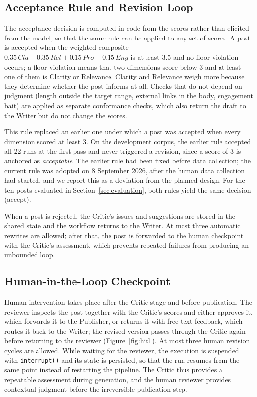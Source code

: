 \documentclass[a4paper,twoside]{article}
\begin{document}
\subsection{Acceptance Rule and Revision Loop}
\label{sec:rule}

The acceptance decision is computed in code from the scores rather than elicited from the model, so that the same rule can be applied to any set of scores. A post is accepted when the weighted composite $0.35\,\mathit{Cla} + 0.35\,\mathit{Rel} + 0.15\,\mathit{Pro} + 0.15\,\mathit{Eng}$ is at least 3.5 and no floor violation occurs; a floor violation means that two dimensions score below 3 and at least one of them is Clarity or Relevance. Clarity and Relevance weigh more because they determine whether the post informs at all. Checks that do not depend on judgment (length outside the target range, external links in the body, engagement bait) are applied as separate conformance checks, which also return the draft to the Writer but do not change the scores.

This rule replaced an earlier one under which a post was accepted when every dimension scored at least 3. On the development corpus, the earlier rule accepted all 22 runs at the first pass and never triggered a revision, since a score of 3 is anchored as \emph{acceptable}. The earlier rule had been fixed before data collection; the current rule was adopted on 8 September 2026, after the human data collection had started, and we report this as a deviation from the planned design. For the ten posts evaluated in Section~\ref{sec:evaluation}, both rules yield the same decision (accept).

When a post is rejected, the Critic's issues and suggestions are stored in the shared state and the workflow returns to the Writer. At most three automatic rewrites are allowed; after that, the post is forwarded to the human checkpoint with the Critic's assessment, which prevents repeated failures from producing an unbounded loop.

\subsection{Human-in-the-Loop Checkpoint}

Human intervention takes place after the Critic stage and before publication. The reviewer inspects the post together with the Critic's scores and either approves it, which forwards it to the Publisher, or returns it with free-text feedback, which routes it back to the Writer; the revised version passes through the Critic again before returning to the reviewer (Figure~\ref{fig:hitl}). At most three human revision cycles are allowed. While waiting for the reviewer, the execution is suspended with \texttt{interrupt()} and its state is persisted, so that the run resumes from the same point instead of restarting the pipeline. The Critic thus provides a repeatable assessment during generation, and the human reviewer provides contextual judgment before the irreversible publication step.
\end{document}
